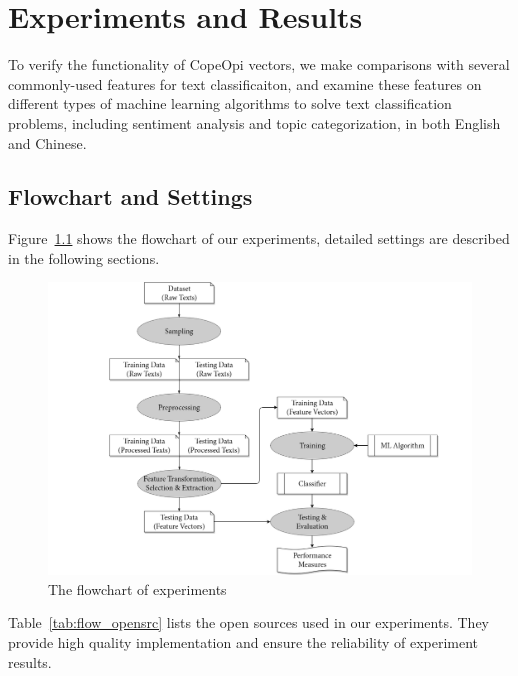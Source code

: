 \chapter{Experiments and Results}
\par To verify the functionality of CopeOpi vectors, we make comparisons with several commonly-used features for text classificaiton, and examine these features on different types of machine learning algorithms to solve text classification problems, including sentiment analysis and topic categorization, in both English and Chinese.
\section{Flowchart and Settings}
\par Figure~\ref{fig:flowchart} shows the flowchart of our experiments, detailed settings are described in the following sections.
\begin{figure}[h]
	\centering
	\includegraphics[scale=0.42]{chapters/ch4/figure/flowchart.png}
	\caption{The flowchart of experiments}
	\label{fig:flowchart}
\end{figure}
\par Table~\ref{tab:flow_opensrc} lists the open sources used in our experiments. They provide high quality implementation and ensure the reliability of experiment results.


